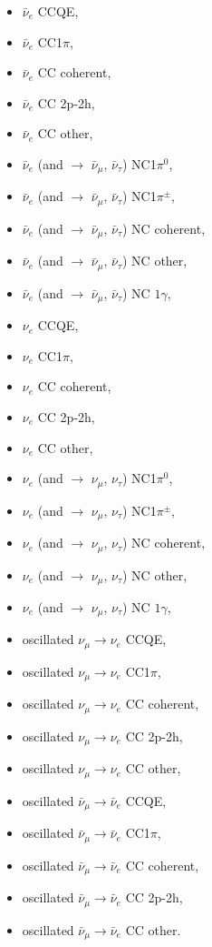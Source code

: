 \begin{itemize}
\item  $\bar{\nu}_{e}$ CCQE,
\item  $\bar{\nu}_{e}$ CC1$\pi$,
\item  $\bar{\nu}_{e}$ CC coherent,
\item  $\bar{\nu}_{e}$ CC 2p-2h,
\item  $\bar{\nu}_{e}$ CC other,

\item  $\bar{\nu}_{e}$ (and $\rightarrow$ $\bar{\nu}_{\mu}$, $\bar{\nu}_{\tau}$) NC1$\pi^{0}$,
\item  $\bar{\nu}_{e}$ (and $\rightarrow$ $\bar{\nu}_{\mu}$, $\bar{\nu}_{\tau}$) NC1$\pi^{\pm}$,
\item  $\bar{\nu}_{e}$ (and $\rightarrow$ $\bar{\nu}_{\mu}$, $\bar{\nu}_{\tau}$) NC coherent,
\item  $\bar{\nu}_{e}$ (and $\rightarrow$ $\bar{\nu}_{\mu}$, $\bar{\nu}_{\tau}$) NC other,
\item  $\bar{\nu}_{e}$ (and $\rightarrow$ $\bar{\nu}_{\mu}$, $\bar{\nu}_{\tau}$) NC $1\gamma$,

\item  $\nu_{e}$ CCQE, 
\item  $\nu_{e}$ CC1$\pi$,
\item  $\nu_{e}$ CC coherent,
\item  $\nu_{e}$ CC 2p-2h,
\item  $\nu_{e}$ CC other,

\item  $\nu_{e}$ (and $\rightarrow$ $\nu_{\mu}$, $\nu_{\tau}$) NC1$\pi^{0}$,
\item  $\nu_{e}$ (and $\rightarrow$ $\nu_{\mu}$, $\nu_{\tau}$) NC1$\pi^{\pm}$,
\item  $\nu_{e}$ (and $\rightarrow$ $\nu_{\mu}$, $\nu_{\tau}$) NC coherent,
\item  $\nu_{e}$ (and $\rightarrow$ $\nu_{\mu}$, $\nu_{\tau}$) NC other,
\item  $\nu_{e}$ (and $\rightarrow$ $\nu_{\mu}$, $\nu_{\tau}$) NC $1\gamma$,

\item  oscillated $\nu_{\mu} \rightarrow \nu_{e}$ CCQE,
\item  oscillated $\nu_{\mu} \rightarrow \nu_{e}$ CC1$\pi$,
\item  oscillated $\nu_{\mu} \rightarrow \nu_{e}$ CC coherent,
\item  oscillated $\nu_{\mu} \rightarrow \nu_{e}$ CC 2p-2h,
\item  oscillated $\nu_{\mu} \rightarrow \nu_{e}$ CC other,

\item  oscillated $\bar{\nu}_{\mu} \rightarrow \bar{\nu}_{e}$ CCQE,
\item  oscillated $\bar{\nu}_{\mu} \rightarrow \bar{\nu}_{e}$ CC1$\pi$,
\item  oscillated $\bar{\nu}_{\mu} \rightarrow \bar{\nu}_{e}$ CC coherent,
\item  oscillated $\bar{\nu}_{\mu} \rightarrow \bar{\nu}_{e}$ CC 2p-2h,
\item  oscillated $\bar{\nu}_{\mu} \rightarrow \bar{\nu}_{e}$ CC other.

\end{itemize}

